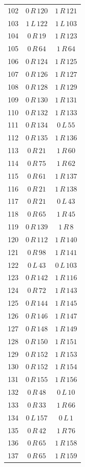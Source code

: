 \begin{longtable}{rcc}
102 & $0\,R\,120$ & $1\,R\,121$\\
103 & $1\,L\,122$ & $1\,L\,103$\\
104 & $0\,R\,19$ & $1\,R\,123$\\
105 & $0\,R\,64$ & $1\,R\,64$\\
106 & $0\,R\,124$ & $1\,R\,125$\\
107 & $0\,R\,126$ & $1\,R\,127$\\
108 & $0\,R\,128$ & $1\,R\,129$\\
109 & $0\,R\,130$ & $1\,R\,131$\\
110 & $0\,R\,132$ & $1\,R\,133$\\
111 & $0\,R\,134$ & $0\,L\,55$\\
112 & $0\,R\,135$ & $1\,R\,136$\\
113 & $0\,R\,21$ & $1\,R\,60$\\
114 & $0\,R\,75$ & $1\,R\,62$\\
115 & $0\,R\,61$ & $1\,R\,137$\\
116 & $0\,R\,21$ & $1\,R\,138$\\
117 & $0\,R\,21$ & $0\,L\,43$\\
118 & $0\,R\,65$ & $1\,R\,45$\\
119 & $0\,R\,139$ & $1\,R\,8$\\
120 & $0\,R\,112$ & $1\,R\,140$\\
121 & $0\,R\,98$ & $1\,R\,141$\\
122 & $0\,L\,43$ & $0\,L\,103$\\
123 & $0\,R\,142$ & $1\,R\,116$\\
124 & $0\,R\,72$ & $1\,R\,143$\\
125 & $0\,R\,144$ & $1\,R\,145$\\
126 & $0\,R\,146$ & $1\,R\,147$\\
127 & $0\,R\,148$ & $1\,R\,149$\\
128 & $0\,R\,150$ & $1\,R\,151$\\
129 & $0\,R\,152$ & $1\,R\,153$\\
130 & $0\,R\,152$ & $1\,R\,154$\\
131 & $0\,R\,155$ & $1\,R\,156$\\
132 & $0\,R\,48$ & $0\,L\,10$\\
133 & $0\,R\,33$ & $1\,R\,66$\\
134 & $0\,L\,157$ & $0\,L\,1$\\
135 & $0\,R\,42$ & $1\,R\,76$\\
136 & $0\,R\,65$ & $1\,R\,158$\\
137 & $0\,R\,65$ & $1\,R\,159$\\

\end{longtable}
